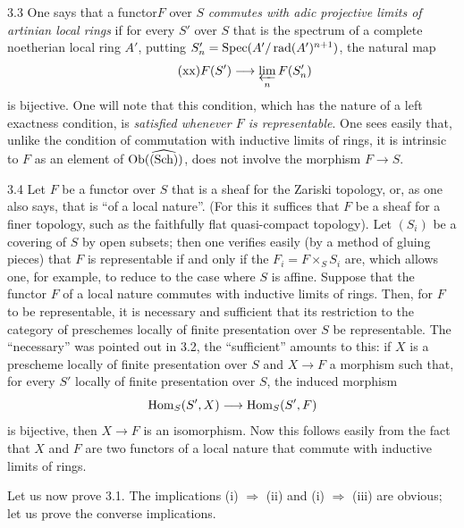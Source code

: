 \begin{remark}{3.3}\label{XI.3.3}
One says that a functor\footnotemark[2] $F$ over $S$ \emph{commutes with adic projective limits of artinian local rings} if for every $S'$ over $S$ that is the spectrum of a complete noetherian local ring $A'$, putting $S'_n=\Spec(A'/\operatorname{rad}(A')^{n+1})$, the natural map
\begin{equation}\tag{xx}
F(S')\to\varprojlim_n F(S'_n)
\end{equation}
is bijective. One will note that this condition, which has the nature of a left exactness condition, is \emph{satisfied whenever $F$ is representable}. One sees easily that, unlike the condition of commutation with inductive limits of rings, it is intrinsic to $F$ as an element of $\Ob(\widehat{\Sch})$, \ie does not involve the morphism $F\to S$.
\end{remark}
\begin{remark}{3.4}\label{XI.3.4}
Let $F$ be a functor over $S$ that is a sheaf for the Zariski topology, or, as one also says, that is ``of a local nature''. (For this it suffices that $F$ be a sheaf for a finer topology, such as the faithfully flat quasi-compact topology). Let $(S_i)$ be a covering of $S$ by open subsets; then one verifies easily (by a method of gluing pieces) that $F$ is representable if and only if the $F_i=F\times_S S_i$ are, which allows one, for example, to reduce to the case where $S$ is affine. Suppose that the functor $F$ of a local nature commutes with inductive limits of rings. Then, for $F$ to be representable, it is necessary and sufficient that its restriction to the category of preschemes locally of finite presentation over $S$ be representable. The ``necessary'' was pointed out in 3.2, the ``sufficient'' amounts to this: if $X$ is a prescheme locally of finite presentation over $S$ and $X\to F$ a morphism such that, for every $S'$ locally of finite presentation over $S$, the induced morphism
\[
\Hom_S(S',X)\to\Hom_S(S',F)
\]
is bijective, then $X\to F$ is an isomorphism. Now this follows easily from the fact that $X$ and $F$ are two functors of a local nature that commute with inductive limits of rings.
\end{remark}

Let us now prove 3.1. The implications (i) $\Rightarrow$ (ii) and (i) $\Rightarrow$ (iii) are obvious; let us prove the converse implications.

